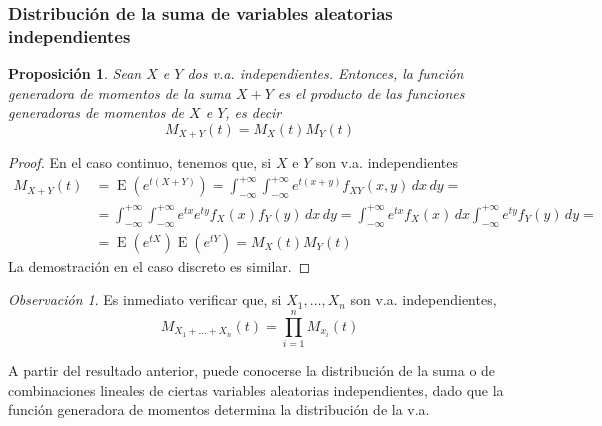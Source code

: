 \documentclass[11pt]{article}
\theoremstyle{plain}
\newtheorem*{pro}{Proposición}
\theoremstyle{definition}
\theoremstyle{remark}
\newtheorem*{obs}{Observación}
\newcommand{\esp}[0]{\ensuremath{\operatorname{E}}}  %
\begin{document}
    \subsubsection{Distribución de la suma de variables aleatorias independientes}

      \begin{pro}
        Sean $X$ e $Y$ dos v.a. independientes. Entonces, la función generadora de momentos de la suma $X + Y$ es el producto de las funciones generadoras de momentos de $X$ e $Y$, es decir
        \[ M_{X + Y}(t) = M_X(t) M_Y(t) \]
      \end{pro}
      \begin{proof}
        En el caso continuo, tenemos que, si $X$ e $Y$ son v.a. independientes
        \[ \begin{split}
          M_{X + Y}(t) &= \esp \left(e^{t(X + Y)} \right) = \int_{-\infty}^{+\infty} \int_{-\infty}^{+\infty} e^{t(x + y)} f_{XY}(x,y) \,dx \,dy = \\
          &= \int_{-\infty}^{+\infty} \int_{-\infty}^{+\infty} e^{tx} e^{ty} f_X(x) f_Y(y) \,dx \,dy = \int_{-\infty}^{+\infty} e^{tx} f_X(x) \,dx \int_{-\infty}^{+\infty} e^{ty} f_Y(y) \,dy = \\
          &= \esp \left(e^{tX} \right) \esp \left(e^{tY} \right) = M_X(t) M_Y(t)
        \end{split} \]
        La demostración en el caso discreto es similar.
      \end{proof}

      \begin{obs}
        Es inmediato verificar que, si $X_1, \dots, X_n$ son v.a. independientes,
        \[ M_{X_1 + \dots + X_n}(t) = \prod_{i=1}^n M_{x_i}(t) \]
      \end{obs}

      A partir del resultado anterior, puede conocerse la distribución de la suma o de combinaciones lineales de ciertas variables aleatorias independientes, dado que la función generadora de momentos determina la distribución de la v.a.
\end{document}
